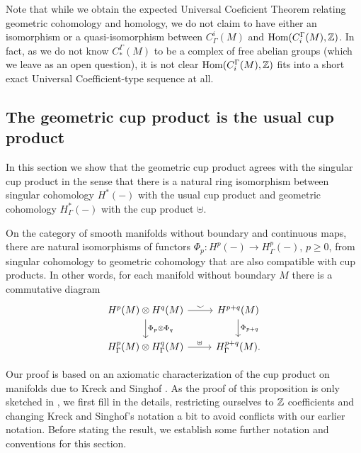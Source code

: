 \begin{remark}
	Note that while we obtain the expected Universal Coeficient Theorem relating geometric cohomology and homology, we do not claim to have either an isomorphism or a quasi-isomorphism between $C^i_\Gamma(M)$ and $\textup{Hom}(C_i^\Gamma(M),\mathbb{Z})$.
	In fact, as we do not know $C_*^\Gamma(M)$ to be a complex of free abelian groups (which we leave as an open question), it is not clear $\textup{Hom}(C_i^\Gamma(M),\mathbb{Z})$ fits into a short exact Universal Coefficient-type sequence at all.
\end{remark}

\subsection{The geometric cup product is the usual cup product}\label{S: usual cup}

In this section we show that the geometric cup product agrees with the singular cup product in the sense that there is a natural ring isomorphism between singular cohomology $H^*(-)$ with the usual cup product and geometric cohomology $H^*_\Gamma(-)$ with the cup product $\uplus$.

\begin{theorem}\label{T: intersection is cup product}
	On the category of smooth manifolds without boundary and continuous maps, there are natural isomorphisms of functors $\Phi_p \colon H^p(-) \to H^p_\Gamma(-)$, $p \geq 0$, from singular cohomology to geometric cohomology that are also compatible with cup products.
	In other words, for each manifold without boundary $M$ there is a commutative diagram
	\[
	\begin{tikzcd}
		H^p(M) \otimes H^q(M) \arrow{r}{\smile} \arrow{d}{\Phi_p \otimes \Phi_q} &
		H^{p+q}(M) \arrow{d}{\Phi_{p+q}} \\
		H^p_\Gamma(M) \otimes H^q_\Gamma(M) \arrow{r}{\uplus} & H^{p+q}_\Gamma(M).
	\end{tikzcd}
	\]
\end{theorem}

Our proof is based on an axiomatic characterization of the cup product on manifolds due to Kreck and Singhof \cite[Proposition 12]{Krec10b}.
As the proof of this proposition is only sketched in \cite{Krec10b}, we first fill in the details, restricting ourselves to $\mathbb{Z}$ coefficients and changing Kreck and Singhof's notation a bit to avoid conflicts with our earlier notation.
Before stating the result, we establish some further notation and conventions for this section.

